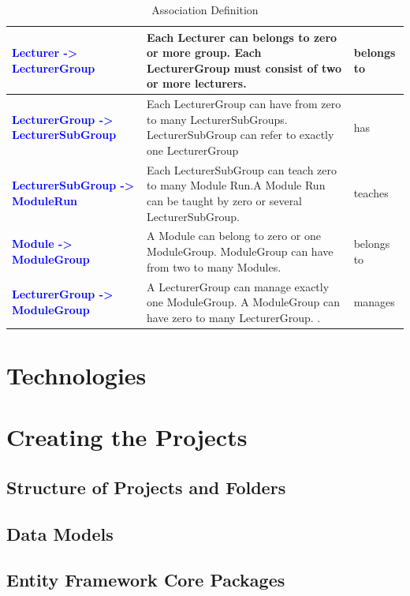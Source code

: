 \documentclass{scrartcl}
\begin{document}
\begin{table}[H]
\begin{center}
\begin{tabular}{| p{6.5cm}| p{6.5cm} |p{2.5cm}|}
 \textbf{\textcolor{blue}{ Lecturer -> LecturerGroup}}  & 
 Each Lecturer can belongs to zero or more group. 
 Each LecturerGroup must consist of two or more lecturers. &  belongs to\\ \hline
 
  \textbf{\textcolor{blue}{  LecturerGroup -> LecturerSubGroup}}  & 
 Each LecturerGroup can have from zero to many LecturerSubGroups.
 LecturerSubGroup can refer to exactly one LecturerGroup &  has\\ \hline
 
\textbf{\textcolor{blue}{LecturerSubGroup -> ModuleRun}}  &  Each LecturerSubGroup can teach zero to many Module Run.A Module Run can be taught by zero or several LecturerSubGroup.
 & teaches\\ \hline

\textbf{\textcolor{blue}{Module -> ModuleGroup}}  &  
A Module can belong to zero or one ModuleGroup. ModuleGroup can have from two to many Modules. & belongs to\\ \hline

\textbf{\textcolor{blue}{LecturerGroup -> ModuleGroup}}  &  A LecturerGroup can manage exactly one ModuleGroup. A ModuleGroup can have zero to many LecturerGroup.
. & manages\\ \hline
\end{tabular}
\end{center}
\caption{Association Definition}
\label{table2}
\end{table}


\section{Technologies}

\section{Creating the Projects}

\subsection{Structure of Projects and Folders}

\subsection{Data Models}

\subsection{Entity Framework Core Packages}
\end{document}
